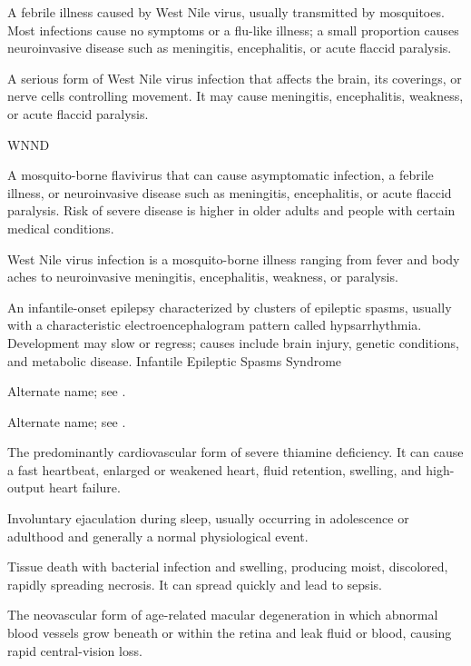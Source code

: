  A febrile illness caused by West Nile virus, usually transmitted by mosquitoes. Most infections cause no symptoms or a flu-like illness; a small proportion causes neuroinvasive disease such as meningitis, encephalitis, or acute flaccid paralysis.

 A serious form of West Nile virus infection that affects the brain, its coverings, or nerve cells controlling movement. It may cause meningitis, encephalitis, weakness, or acute flaccid paralysis.

\synonyms
WNND

 A mosquito-borne flavivirus that can cause asymptomatic infection, a febrile illness, or neuroinvasive
disease such as meningitis, encephalitis, or acute flaccid paralysis. Risk of severe disease
is higher in older adults and people with certain medical conditions.

 West Nile virus infection is a mosquito-borne illness ranging from fever and body aches to neuroinvasive meningitis, encephalitis, weakness, or paralysis.

 An infantile-onset epilepsy characterized by clusters of epileptic spasms, usually with a characteristic electroencephalogram pattern called hypsarrhythmia. Development may slow or regress; causes include brain injury, genetic conditions, and metabolic disease.
\synonyms
Infantile Epileptic Spasms Syndrome

 Alternate name; see .

 Alternate name; see .

 The predominantly cardiovascular form of severe thiamine deficiency. It can cause a fast heartbeat, enlarged or weakened heart, fluid retention, swelling, and high-output heart failure.

 Involuntary ejaculation during sleep, usually occurring in adolescence or adulthood and generally a normal physiological event.

 Tissue death with bacterial infection and swelling, producing moist, discolored, rapidly spreading necrosis. It can spread quickly and lead to sepsis.

 The neovascular form of age-related macular degeneration in which abnormal blood vessels grow beneath or within the retina and leak fluid or blood, causing rapid central-vision loss.

